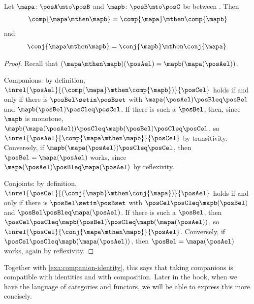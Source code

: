 \begin{lemma}
    \label{lem:companion-conjoint-composition}
    Let $\mapa \colon \posA \mto \posB$ and $\mapb \colon \posB \mto \posC$ be  between .
    Then
    \begin{equation}
        \comp{\mapa \mthen \mapb} = \comp{\mapa} \mthen \comp{\mapb}
    \end{equation}
    and
    \begin{equation}
        \conj{\mapa \mthen \mapb} = \conj{\mapb} \mthen \conj{\mapa}.
    \end{equation}
\end{lemma}
\begin{proof}
    Recall that $(\mapa \mthen \mapb)(\posAel) = \mapb(\mapa(\posAel))$.

    Companions: by definition, $\inrel{\posAel}{(\comp{\mapa} \mthen \comp{\mapb})}{\posCel}$ holds if and only if there is $\posBel \setin \posBset$ with $\mapa(\posAel) \posBleq \posBel$ and $\mapb(\posBel) \posCleq \posCel$.
    If there is such a $\posBel$, then, since $\mapb$ is monotone, $\mapb(\mapa(\posAel)) \posCleq \mapb(\posBel) \posCleq \posCel$, so $\inrel{\posAel}{\comp{\mapa \mthen \mapb}}{\posCel}$ by transitivity.
    Conversely, if $\mapb(\mapa(\posAel)) \posCleq \posCel$, then $\posBel = \mapa(\posAel)$ works, since $\mapa(\posAel) \posBleq \mapa(\posAel)$ by reflexivity.

    Conjoints: by definition, $\inrel{\posCel}{(\conj{\mapb} \mthen \conj{\mapa})}{\posAel}$ holds if and only if there is $\posBel \setin \posBset$ with $\posCel \posCleq \mapb(\posBel)$ and $\posBel \posBleq \mapa(\posAel)$.
    If there is such a $\posBel$, then $\posCel \posCleq \mapb(\posBel) \posCleq \mapb(\mapa(\posAel))$, so $\inrel{\posCel}{\conj{\mapa \mthen \mapb}}{\posAel}$.
    Conversely, if $\posCel \posCleq \mapb(\mapa(\posAel))$, then $\posBel = \mapa(\posAel)$ works, again by reflexivity.
\end{proof}

Together with \cref{exa:companion-identity}, this says that taking companions is compatible with identities and with composition.
Later in the book, when we have the language of categories and functors, we will be able to express this more concisely.

